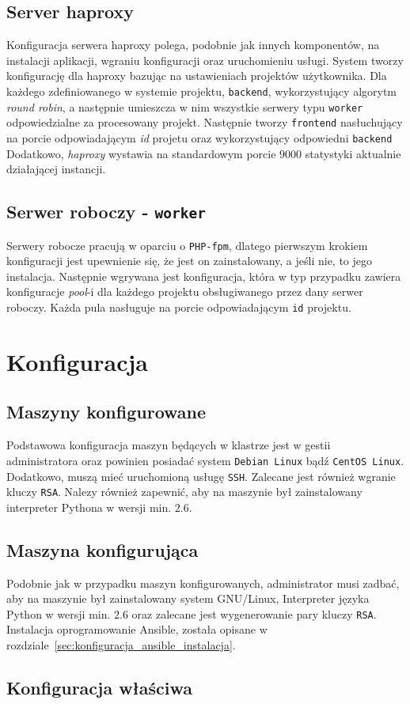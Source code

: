 \subsection{Server haproxy}
Konfiguracja serwera haproxy polega, podobnie jak innych komponentów, na instalacji aplikacji, wgraniu konfiguracji oraz uruchomieniu usługi.
System tworzy konfigurację dla haproxy bazując na ustawieniach projektów użytkownika.
Dla każdego zdefiniowanego w systemie projektu, \texttt{backend}, wykorzystujący algorytm \textit{round robin}, a następnie umieszcza w nim wszystkie serwery typu \texttt{worker} odpowiedzialne za procesowany projekt.
Następnie tworzy \texttt{frontend} nasłuchujący na porcie odpowiadającym \textit{id} projetu oraz wykorzystujący odpowiedni \texttt{backend}\\
Dodatkowo, \textit{haproxy} wystawia na standardowym porcie $9000$ statystyki aktualnie działającej instancji.
\subsection{Serwer roboczy - \texttt{worker}}
Serwery robocze pracują w oparciu o \texttt{PHP-fpm}, dlatego pierwszym krokiem konfiguracji jest upewnienie się, że jest on zainstalowany, a jeśli nie, to jego instalacja.
Następnie wgrywana jest konfiguracja, która w typ przypadku zawiera konfiguracje \textit{pool}-i dla każdego projektu obsługiwanego przez dany serwer roboczy.
Każda pula nasługuje na porcie odpowiadającym \texttt{id} projektu.
\section{Konfiguracja}
\subsection{Maszyny konfigurowane}
Podstawowa konfiguracja maszyn będących w klastrze jest w gestii administratora oraz powinien posiadać system \texttt{Debian Linux} bądź \texttt{CentOS Linux}.
Dodatkowo, muszą mieć uruchomioną usługę \texttt{SSH}.
Zalecane jest również wgranie kluczy \texttt{RSA}.
Nalezy również zapewnić, aby na maszynie był zainstalowany interpreter Pythona w wersji min. $2.6$.
\subsection{Maszyna konfigurująca}
Podobnie jak w przypadku maszyn konfigurowanych, administrator musi zadbać, aby na maszynie był zainstalowany system GNU/Linux, Interpreter języka Python w wersji min. $2.6$ oraz zalecane jest wygenerowanie pary kluczy \texttt{RSA}.
Instalacja oprogramowanie Ansible, została opisane w rozdziale~\ref{sec:konfiguracja_ansible_instalacja}.
\subsection{Konfiguracja właściwa}
